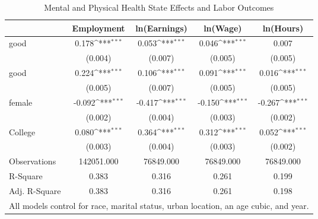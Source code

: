 \def\sym#1{\ifmmode^{#1}\else\(^{#1}\)\fi}
\begin{table}
\center\caption{Mental and Physical Health State Effects and Labor Outcomes}
\footnotesize
\begin{tabular}{l*{4}{c}}
                    &\multicolumn{1}{c}{Employment}&\multicolumn{1}{c}{ln(Earnings)}&\multicolumn{1}{c}{ln(Wage)}&\multicolumn{1}{c}{ln(Hours)}\\
\midrule
good                &       0.178\sym{***}&       0.053\sym{***}&       0.046\sym{***}&       0.007         \\
                    &     (0.004)         &     (0.007)         &     (0.005)         &     (0.005)         \\
good                &       0.224\sym{***}&       0.106\sym{***}&       0.091\sym{***}&       0.016\sym{***}\\
                    &     (0.005)         &     (0.007)         &     (0.005)         &     (0.005)         \\
female              &      -0.092\sym{***}&      -0.417\sym{***}&      -0.150\sym{***}&      -0.267\sym{***}\\
                    &     (0.002)         &     (0.004)         &     (0.003)         &     (0.002)         \\
College             &       0.080\sym{***}&       0.364\sym{***}&       0.312\sym{***}&       0.052\sym{***}\\
                    &     (0.003)         &     (0.004)         &     (0.003)         &     (0.002)         \\
\midrule
Observations        &  142051.000         &   76849.000         &   76849.000         &   76849.000         \\
R-Square            &       0.383         &       0.316         &       0.261         &       0.199         \\
Adj. R-Square       &       0.383         &       0.316         &       0.261         &       0.198         \\
\hline
\multicolumn{5}{l}{\small{All models control for race, marital status, urban location, an age cubic, and year.}} \\
\end{tabular}
\end{table}
